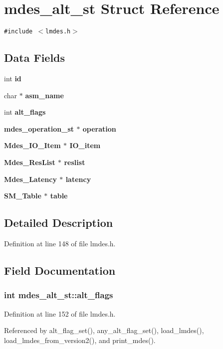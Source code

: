 \section{mdes\_\-alt\_\-st Struct Reference}
\label{structmdes__alt__st}
{\tt \#include $<$lmdes.h$>$}

\subsection*{Data Fields}
\begin{CompactItemize}
\item 
int \bf{id}
\item 
char $\ast$ \bf{asm\_\-name}
\item 
int \bf{alt\_\-flags}
\item 
\bf{mdes\_\-operation\_\-st} $\ast$ \bf{operation}
\item 
\bf{Mdes\_\-IO\_\-Item} $\ast$ \bf{IO\_\-item}
\item 
\bf{Mdes\_\-Res\-List} $\ast$ \bf{reslist}
\item 
\bf{Mdes\_\-Latency} $\ast$ \bf{latency}
\item 
\bf{SM\_\-Table} $\ast$ \bf{table}
\end{CompactItemize}


\subsection{Detailed Description}




Definition at line 148 of file lmdes.h.

\subsection{Field Documentation}
\subsubsection{\setlength{\rightskip}{0pt plus 5cm}int \bf{mdes\_\-alt\_\-st::alt\_\-flags}}\label{structmdes__alt__st_1f343b194b6524edfc1bb329bfdb2c57}




Definition at line 152 of file lmdes.h.

Referenced by alt\_\-flag\_\-set(), any\_\-alt\_\-flag\_\-set(), load\_\-lmdes(), load\_\-lmdes\_\-from\_\-version2(), and print\_\-mdes().
